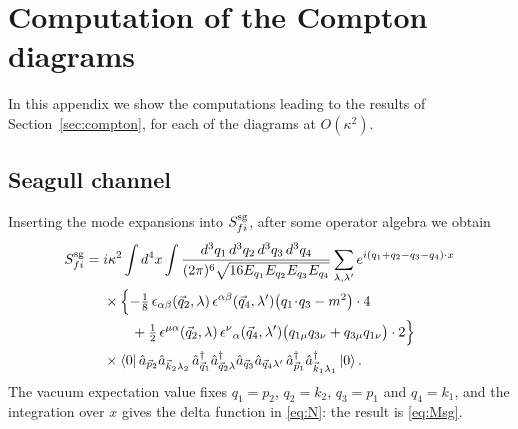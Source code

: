 \documentclass[12pt,a4paper,oneside]{article}
\numberwithin{equation}{section}   %
\begin{document}
\section{Computation of the Compton diagrams}
\label{app:compton}

In this appendix we show the computations leading to the results of
Section~\ref{sec:compton}, for each of the diagrams at $O(\kappa^2)$.

\subsection{Seagull channel}
Inserting the mode expansions into $S^{\rm sg}_{fi}$, after some operator algebra we obtain
\begin{align}
S^{\rm sg}_{fi}=\;&i\kappa^{2}
\int d^{4}x
\int\frac{d^{3}q_1\,d^{3}q_2\,d^{3}q_3\,d^{3}q_4}
{(2\pi)^{6}\sqrt{16E_{q_1}E_{q_2}E_{q_3}E_{q_4}}}
\sum_{\lambda,\lambda'}
e^{i(q_1+q_2-q_3-q_4)\cdot x}\notag\\
&\times\Bigl\{
-\tfrac18\,\epsilon_{\alpha\beta}(\vec q_2,\lambda)\,\epsilon^{\alpha\beta}(\vec q_4,\lambda')
\bigl(q_1\!\cdot\!q_3-m^{2}\bigr)\cdot 4\notag\\
&\qquad
+\tfrac12\,\epsilon^{\mu\alpha}(\vec q_2,\lambda)\,\epsilon^{\nu}{}_{\alpha}(\vec q_4,\lambda')
\bigl(q_{1\mu}q_{3\nu}+q_{3\mu}q_{1\nu}\bigr)\cdot 2
\Bigr\}\notag\\
&\times
\bra{0}\hat a_{\vec p_2}\hat a_{\vec k_2\lambda_2}\,
\hat a^{\dagger}_{\vec q_1}\hat a^{\dagger}_{\vec q_2\lambda}\hat a_{\vec q_3}\hat a_{\vec q_4\lambda'}\,
\hat a^{\dagger}_{\vec p_1}\hat a^{\dagger}_{\vec k_1\lambda_1}\ket{0}.
\label{seagull}
\end{align}
The vacuum expectation value fixes $q_1=p_2$, $q_2=k_2$, $q_3=p_1$ and $q_4=k_1$, and the
integration over $x$ gives the delta function in \eqref{eq:N}: the result is \eqref{eq:Msg}.
\end{document}
